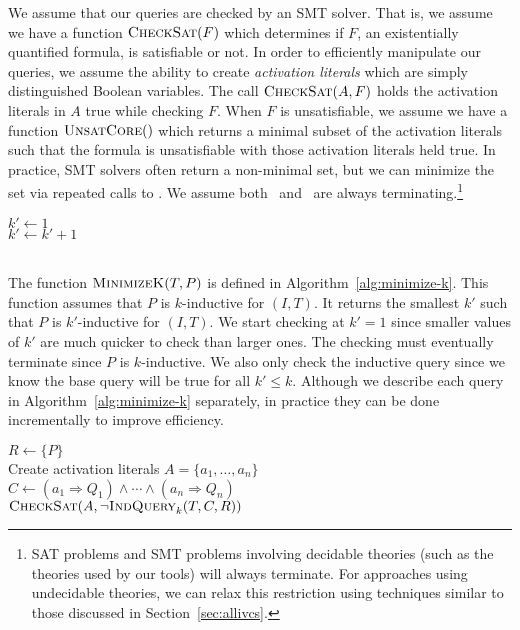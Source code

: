 We assume that our queries are checked by an SMT solver. That is, we
assume we have a function $\textsc{CheckSat}(F)$ which determines if $F$, an
existentially quantified formula, is satisfiable or not. In order to
efficiently manipulate our queries, we assume the ability to create
{\em activation literals} which are simply distinguished Boolean
variables. The call $\textsc{CheckSat}(A, F)$ holds the activation literals in
$A$ true while checking $F$. When $F$ is unsatisfiable, we assume we
have a function $\textsc{UnsatCore}()$ which returns a minimal subset of the
activation literals such that the formula is unsatisfiable with those
activation literals held true. In practice, SMT solvers often return a
non-minimal set, but we can minimize the set via repeated calls to
\checksat.  We assume both \checksat\ and \unsatcore\ are always
terminating.\footnote {SAT problems and SMT problems involving decidable theories (such as the theories used by our tools) will always terminate.  For approaches using undecidable theories, we can relax this restriction using  techniques similar to those discussed in Section~\ref{sec:allivcs}.}



\begin{algorithm}[t]
  $k' \leftarrow 1$ \\
   {
    $k' \leftarrow k' + 1$ \\
    }
   \\
\caption{$\mink(T, P)$}
\label{alg:minimize-k}
\end{algorithm}

The function $\mink(T, P)$ is defined in
Algorithm~\ref{alg:minimize-k}. This function assumes that $P$ is
$k$-inductive for $(I, T)$. It returns the smallest $k'$ such that $P$
is $k'$-inductive for $(I, T)$. We start checking at $k' = 1$ since
smaller values of $k'$ are much quicker to check than larger ones. The
checking must eventually terminate since $P$ is $k$-inductive. We also
only check the inductive query since we know the base query will be
true for all $k' \leq k$. Although we describe each query in
Algorithm~\ref{alg:minimize-k} separately, in practice they can be
done incrementally to improve efficiency.

\begin{algorithm}[t]
  $R \leftarrow \{P\}$ \\
  Create activation literals $A = \{a_1, \ldots, a_n\}$ \\
  $C \leftarrow (a_1 \Rightarrow Q_1) \land \cdots \land (a_n \Rightarrow Q_n)$ \\
   {
    $\textsc{CheckSat}(A, \neg\textsc{IndQuery}_k(T, C, R))$ \\
  }
\caption{$\reduceinv_k(T, \{Q_1, \ldots, Q_n\}, P)$}
\label{alg:reduce-invariants}
\end{algorithm}

